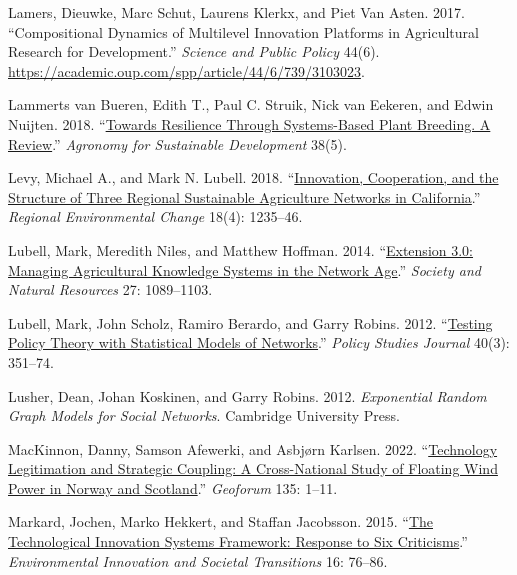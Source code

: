 \documentclass[twoside,12pt,final]{ucthesis-CA2012}
\newlength{\cslhangindent}
\newenvironment{CSLReferences}[2] %
 {%
  \setlength{\parindent}{0pt}
  \ifodd #1 \everypar{\setlength{\hangindent}{\cslhangindent}}\ignorespaces\fi
  \ifnum #2 > 0
  \setlength{\parskip}{#2\baselineskip}
  \fi
 }%
 {}
\begin{document}
\begin{ucmainmatter}
\begin{CSLReferences}{1}{0}
\leavevmode{}%
Lamers, Dieuwke, Marc Schut, Laurens Klerkx, and Piet Van Asten. 2017. {``Compositional Dynamics of Multilevel Innovation Platforms in Agricultural Research for Development.''} \emph{Science and Public Policy} 44(6). \url{https://academic.oup.com/spp/article/44/6/739/3103023}.

\leavevmode{}%
Lammerts van Bueren, Edith T., Paul C. Struik, Nick van Eekeren, and Edwin Nuijten. 2018. {``\href{https://doi.org/10.1007/s13593-018-0522-6}{Towards Resilience Through Systems-Based Plant Breeding. A Review}.''} \emph{Agronomy for Sustainable Development} 38(5).

\leavevmode{}%
Levy, Michael A., and Mark N. Lubell. 2018. {``\href{https://doi.org/10.1007/s10113-017-1258-6}{Innovation, Cooperation, and the Structure of Three Regional Sustainable Agriculture Networks in California}.''} \emph{Regional Environmental Change} 18(4): 1235--46.

\leavevmode{}%
Lubell, Mark, Meredith Niles, and Matthew Hoffman. 2014. {``\href{https://doi.org/10.1080/08941920.2014.933496}{Extension 3.0: Managing Agricultural Knowledge Systems in the Network Age}.''} \emph{Society and Natural Resources} 27: 1089--1103.

\leavevmode{}%
Lubell, Mark, John Scholz, Ramiro Berardo, and Garry Robins. 2012. {``\href{https://doi.org/10.1111/j.1541-0072.2012.00457.x}{Testing Policy Theory with Statistical Models of Networks}.''} \emph{Policy Studies Journal} 40(3): 351--74.

\leavevmode{}%
Lusher, Dean, Johan Koskinen, and Garry Robins. 2012. \emph{Exponential Random Graph Models for Social Networks}. Cambridge University Press.

\leavevmode{}%
MacKinnon, Danny, Samson Afewerki, and Asbjørn Karlsen. 2022. {``\href{https://doi.org/10.1016/j.geoforum.2022.07.008}{Technology Legitimation and Strategic Coupling: A Cross-National Study of Floating Wind Power in Norway and Scotland}.''} \emph{Geoforum} 135: 1--11.

\leavevmode{}%
Markard, Jochen, Marko Hekkert, and Staffan Jacobsson. 2015. {``\href{https://doi.org/10.1016/j.eist.2015.07.006}{The Technological Innovation Systems Framework: Response to Six Criticisms}.''} \emph{Environmental Innovation and Societal Transitions} 16: 76--86.


\end{CSLReferences}
\end{ucmainmatter}
\end{document}
